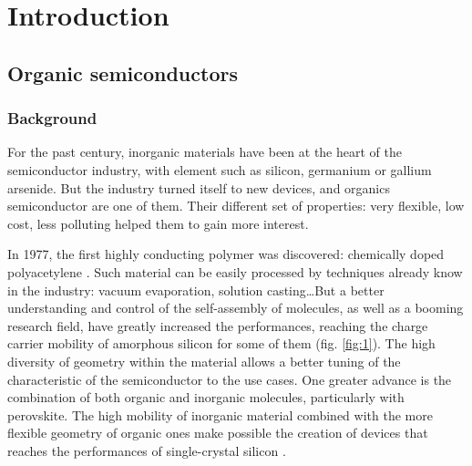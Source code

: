 
\chapter{Introduction}
\label{chap:intro}

\makeendnotes  %

\section{Organic semiconductors}

\subsection{Background}

For the past century, inorganic materials have been at the heart of the semiconductor industry, with element such as silicon, germanium or gallium arsenide. But the industry turned itself to new devices, and organics semiconductor are one of them. Their different set of properties: very flexible, low cost, less polluting helped them to gain more interest.

In 1977, the first highly conducting polymer was discovered: chemically doped polyacetylene \cite{polyacetylene}. Such material can be easily processed by techniques already know in the industry: vacuum evaporation, solution casting\dots But a better understanding and control of the self-assembly of molecules, as well as a booming research field, have greatly increased the performances, reaching the charge carrier mobility of amorphous silicon for some of them (fig. \ref{fig:1}). The high diversity of geometry within the material allows a better tuning of the characteristic of the semiconductor to the use cases. One greater advance is the combination of both organic and inorganic molecules, particularly with perovskite. The high mobility of inorganic material combined with the more flexible geometry of organic ones make possible the creation of devices that reaches the performances of single-crystal silicon \cite{IBM,perovskite}.

